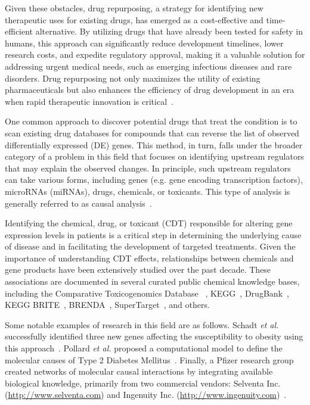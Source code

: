 \documentclass[Minh_PhD_thesis.tex]{subfiles}
\begin{document}
Given these obstacles, drug repurposing, a strategy for identifying new therapeutic uses for existing drugs, has emerged as a cost-effective and time-efficient alternative. By utilizing drugs that have already been tested for safety in humans, this approach can significantly reduce development timelines, lower research costs, and expedite regulatory approval, making it a valuable solution for addressing urgent medical needs, such as emerging infectious diseases and rare disorders. Drug repurposing not only maximizes the utility of existing pharmaceuticals but also enhances the efficiency of drug development in an era when rapid therapeutic innovation is critical~\cite{ashburn2004drug,chong2007new}.

One common approach to discover potential drugs that treat the condition is to scan existing drug databases for compounds that can reverse the list of observed differentially expressed (DE) genes.  
This method, in turn, falls under the broader category of a problem in this field that focuses on identifying upstream regulators that may explain the observed changes. In principle, such upstream regulators can take various forms, including genes (e.g. gene encoding transcription factors), microRNAs (miRNAs), drugs, chemicals, or toxicants. This type of analysis is generally referred to as causal analysis~\cite{chindelevitch2012causal,felciano2013predictive, kramer2013causal, schadt:2005}. 

Identifying the chemical, drug, or toxicant (CDT) responsible for altering gene expression levels in patients is a critical step in determining the underlying cause of disease and in facilitating the development of targeted treatments. Given the importance of understanding CDT effects, relationships between chemicals and gene products have been extensively studied over the past decade. These associations are documented in several curated public chemical knowledge bases, including the Comparative Toxicogenomics Database ~\cite{mattingly2006comparative}, KEGG~\cite{Kanehisa:2000},  DrugBank~\cite{law2014drugbank}, KEGG BRITE~\cite{kanehisa2006genomics}, BRENDA~\cite{schomburg2004brenda}, SuperTarget~\cite{gunther2007supertarget}, and others. 


Some notable examples of research in this field are as follows. Schadt \emph{et al.} successfully identified three new genes affecting the susceptibility to obesity using this approach~\cite{schadt:2005}.
Pollard \emph{et al.} proposed a computational model to define the molecular causes of Type 2 Diabetes Mellitus~\cite{pollard2005computational}.  Finally, a Pfizer research group created networks of molecular causal interactions by integrating available biological knowledge, primarily from two commercial vendors: Selventa Inc. (\href{http://www.selventa.com}{http://www.selventa.com}) and Ingenuity Inc. (\href{http://www.ingenuity.com}{http://www.ingenuity.com})~\cite{chindelevitch2012causal}.
\end{document}
